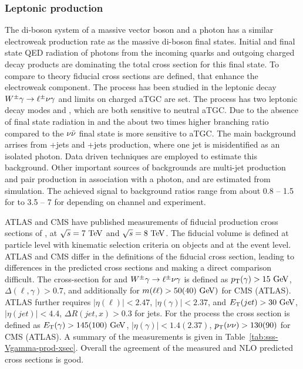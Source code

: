 \subsubsection{Leptonic \Vg production}
\label{sss-Vgammaprod}



The di-boson system of a massive vector boson and a photon has a similar 
electroweak production rate as the massive di-boson final states. Initial
and final state QED radiation of photons from the incoming quarks and
outgoing charged decay products are dominating the total cross section 
for this final state. To compare to theory fiducial cross sections are defined,
that enhance the electroweak component. The \Wg process has been studied in the
leptonic decay $W^{\pm}\gamma \rightarrow \ell^\pm \nu \gamma $ and limits on charged aTGC are set. The \Zg process
has two leptonic decay modes \Zgllg\; and \Zgvvg, which are both sensitive
to neutral aTGC. Due to the absence of final state radiation in \Ztovv\;
and the about two times higher branching ratio compared to \Ztoll\;
the $\nu\bar{\nu}$ final state is more sensitive to aTGC.
The main background arrises from \W+jets and \Z+jets production, where one 
jet is misidentified as an isolated photon. Data driven techniques are employed
to estimate this background. Other important sources of backgrounds are multi-jet production
and \ttbar\; pair production in association with a photon, and are estimated from simulation.
The achieved signal to background ratios range from about 0.8 -- 1.5 for \Wglvg\; to 3.5 -- 7 for \Ztoll\;
depending on channel and experiment. 

ATLAS and CMS have published measurements of fiducial production cross sections of
\Wglvg, \Zgllg at $\rts=7\TeV$ and $\rts=8\TeV$. 
The fiducial volume is defined at particle level with kinematic selection criteria 
on objects and at the event level. ATLAS and CMS differ in the definitions 
of the fiducial cross section, leading to differences in the predicted cross sections
and making a direct comparison difficult. 
The cross-section for \Zgllg\; and $W^{\pm}\gamma \rightarrow \ell^\pm \nu \gamma $ is defined as 
$\pt(\gamma)>15\GeV$,$\Delta(\ell,\gamma)>0.7$, and additionally for \Zg\; $m(\ell\ell)>50 (40) \GeV)$ 
for CMS (ATLAS). ATLAS further requires $|\eta(\ell)|<2.47$,  $|\eta(\gamma)|<2.37$, and 
$\ET(jet) >30\GeV$, $|\eta(jet)|<4.4$, $\Delta R (jet,x) > 0.3$ for jets. 
For the \Zgvvg\; process the cross section is defined as $\ET(\gamma)>145 (100)\GeV$, 
$|\eta(\gamma)|<1.4(2.37)$, $p_{\mathrm{T}}(\nu\nu)>130(90)$ for CMS (ATLAS).
A summary of the measurements is given in Table~\ref{tab:sss-Vgamma-prod-xsec}. Overall the agreement
of the measured and NLO predicted cross sections is good. 

